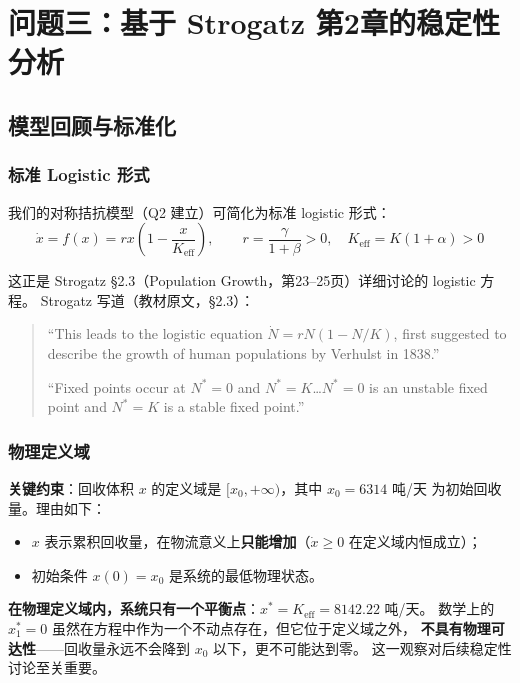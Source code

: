 \documentclass[12pt,a4paper]{article}
\begin{document}
\section{问题三：基于 Strogatz 第2章的稳定性分析}

\subsection{模型回顾与标准化}

\subsubsection{标准 Logistic 形式}
我们的对称拮抗模型（Q2 建立）可简化为标准 logistic 形式：
\begin{equation}\label{eq:logistic2}
\dot{x} = f(x) = r x \left(1 - \frac{x}{K_{\text{eff}}}\right), \qquad
r = \frac{\gamma}{1+\beta} > 0, \quad K_{\text{eff}} = K(1+\alpha) > 0
\end{equation}

这正是 Strogatz \S2.3（Population Growth，第23--25页）详细讨论的 logistic 方程。
Strogatz 写道（教材原文，\S2.3）：

\begin{quote}
\small
``This leads to the logistic equation $\dot{N} = rN(1 - N/K)$, first suggested to describe
the growth of human populations by Verhulst in 1838.''

\medskip
``Fixed points occur at $N^* = 0$ and $N^* = K$\ldots $N^* = 0$ is an unstable fixed point
and $N^* = K$ is a stable fixed point.''
\end{quote}

\subsubsection{物理定义域}
\label{sec:domain}

\textbf{关键约束}：回收体积 $x$ 的定义域是 $[x_0, +\infty)$，其中 $x_0 = 6314$ 吨/天
为初始回收量。理由如下：
\begin{itemize}
  \item $x$ 表示累积回收量，在物流意义上\textbf{只能增加}（$\dot{x} \geq 0$ 在定义域内恒成立）；
  \item 初始条件 $x(0) = x_0$ 是系统的最低物理状态。
\end{itemize}

\textbf{在物理定义域内，系统只有一个平衡点}：$x^* = K_{\text{eff}} = 8142.22$ 吨/天。
数学上的 $x^*_1 = 0$ 虽然在方程中作为一个不动点存在，但它位于定义域之外，
\textbf{不具有物理可达性}——回收量永远不会降到 $x_0$ 以下，更不可能达到零。
这一观察对后续稳定性讨论至关重要。
\end{document}
